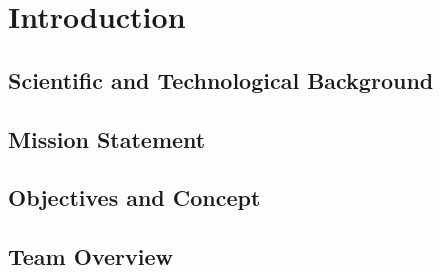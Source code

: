 \section{Introduction}
    \subsection{Scientific and Technological Background}


    \subsection{Mission Statement}


    \subsection{Objectives and Concept}


    \subsection{Team Overview}
